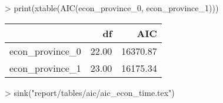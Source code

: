 
> print(xtable(AIC(econ_province_0, econ_province_1)))
\begin{table}[ht]
\centering
\begin{tabular}{rrr}
  \hline
 & df & AIC \\ 
  \hline
econ\_province\_0 & 22.00 & 16370.87 \\ 
  econ\_province\_1 & 23.00 & 16175.34 \\ 
   \hline
\end{tabular}
\end{table}

> sink("report/tables/aic/aic_econ_time.tex")
